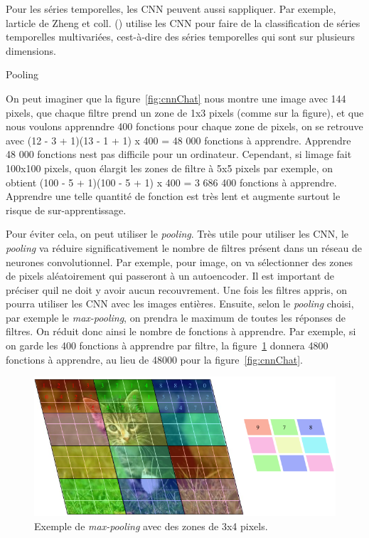 \documentclass[11pt,final,ENIB]{sdm}
\begin{document}
{			Pour les s\'eries temporelles, les CNN peuvent aussi s\textquotesingle appliquer. Par exemple, l\textquotesingle article de Zheng et coll. (\cite{zheng2014time}) utilise les CNN pour faire de la classification de s\'eries temporelles multivari\'ees, c\textquotesingle est-\`a-dire des s\'eries temporelles qui sont sur plusieurs dimensions.

			\medbreak
			\begin{itshape}Pooling\end{itshape}

			On peut imaginer que la figure~\ref{fig:cnnChat} nous montre une image avec 144 pixels, que chaque filtre prend un zone de 1x3 pixels (comme sur la figure), et que nous voulons apprenndre 400 fonctions pour chaque zone de pixels, on se retrouve avec (12 - 3 + 1)(13 - 1 + 1) x 400 = 48 000 fonctions \`a apprendre. Apprendre 48 000 fonctions n\textquotesingle est pas difficile pour un ordinateur. Cependant, si l\textquotesingle image fait 100x100 pixels, qu\textquotesingle on \'elargit les zones de filtre \`a 5x5 pixels par exemple, on obtient (100 - 5 + 1)(100 - 5 + 1) x 400 = 3 686 400 fonctions \`a apprendre. Apprendre une telle quantit\'e de fonction est tr\`es lent et augmente surtout le risque de sur-apprentissage.


			Pour \'eviter cela, on  peut utiliser le \textit{pooling}. Tr\`es utile pour utiliser les CNN, le \textit{pooling} va r\'eduire significativement le nombre de filtres pr\'esent dans un r\'eseau de neurones convolutionnel. Par exemple, pour image, on va s\'electionner des zones de pixels al\'eatoirement qui passeront \`a un autoencoder. Il est important de pr\'eciser qu\textquotesingle il ne doit y avoir aucun recouvrement. Une fois les filtres appris, on pourra utiliser les CNN avec les images enti\`eres. Ensuite, selon le \textit{pooling} choisi, par exemple le \textit{max-pooling}, on  prendra le maximum de toutes les r\'eponses de filtres. On r\'eduit donc ainsi le nombre de fonctions \`a apprendre.
			Par exemple, si on garde les 400 fonctions \`a apprendre par filtre, la figure~\ref{fig:maxpooling} donnera 4800 fonctions \`a apprendre, au lieu de 48000 pour la figure~\ref{fig:cnnChat}.

			\begin{figure}[!ht]
				\centering
				\includegraphics[natwidth=650,natheight=305,scale=0.4]{figures/maxPooling.png}
				\caption{Exemple de \textit{max-pooling} avec des zones de 3x4 pixels.}
				\label{fig:maxpooling}
			\end{figure}

}
\end{document}
